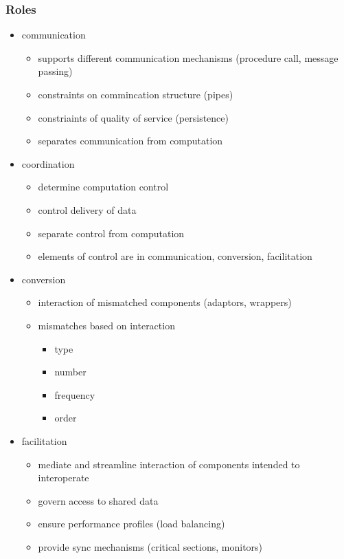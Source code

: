 \documentclass[]{article}
\theoremstyle{definition}
\begin{document}
	\subsubsection{Roles}
	\begin{itemize}
		\item communication
			\begin{itemize}
				\item supports different communication mechanisms (procedure call, message passing)
				\item constraints on commincation structure (pipes)
				\item constriaints of quality of service (persistence)
				\item separates communication from computation
			\end{itemize}
		\item coordination
			\begin{itemize}
				\item determine computation control
				\item control delivery of data
				\item separate control from computation
				\item elements of control are in communication, conversion, facilitation
			\end{itemize}
		\item conversion
			\begin{itemize}
				\item interaction of mismatched components (adaptors, wrappers)
				\item mismatches based on interaction
					\begin{itemize}
						\item type
						\item number
						\item frequency
						\item order
					\end{itemize}
			\end{itemize}
		\item facilitation
			\begin{itemize}
				\item mediate and streamline interaction of components intended to interoperate
				\item govern access to shared data
				\item ensure performance profiles (load balancing)
				\item provide sync mechanisms (critical sections, monitors)
			\end{itemize}
	\end{itemize}
\end{document}
